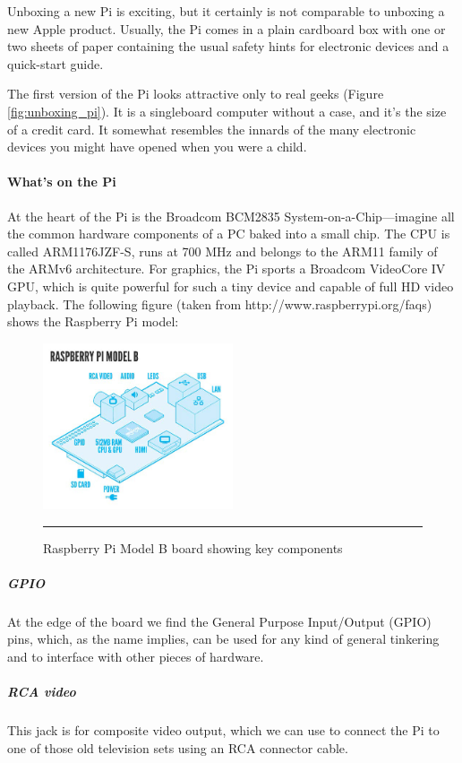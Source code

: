 \hfill \break
Unboxing a new Pi is exciting, but it certainly is not comparable to unboxing
a new Apple product. Usually, the Pi comes in a plain cardboard box with
one or two sheets of paper containing the usual safety hints for electronic
devices and a quick-start guide.

The first version of the Pi looks attractive only to real geeks (Figure \ref{fig:unboxing_pi}). It is a singleboard
computer without a case, and it’s the size of a credit card. It somewhat
resembles the innards of the many electronic devices you might have opened
when you were a child.

\paragraph*{What’s on the Pi}
\hfill \break
At the heart of the Pi is the Broadcom BCM2835 System-on-a-Chip—imagine all the
common hardware components of a PC baked into a small chip. The CPU is called
ARM1176JZF-S, runs at 700 MHz and belongs to the ARM11 family of the ARMv6
architecture. For graphics, the Pi sports a Broadcom VideoCore IV GPU, which is
quite powerful for such a tiny device and capable of full HD video playback. The
following figure (taken from http://www.raspberrypi.org/faqs) shows the
Raspberry Pi model:
\begin{figure}[h!]
  \centering
    \includegraphics[width=0.5\textwidth]{./Pictures/raspberry_pi_b2.jpg}
  \rule{0.7\textwidth}{1pt}
 \caption{Raspberry Pi Model B board showing key components}
\end{figure}

\subparagraph*{GPIO}
\hfill \break
At the edge of the board we find the General Purpose Input/Output (GPIO) pins,
which, as the name implies, can be used for any kind of general tinkering and to
interface with other pieces of hardware.

\subparagraph*{RCA video}
\hfill \break
This jack is for composite video output, which we can use to connect the Pi to one of
those old television sets using an RCA connector cable.


